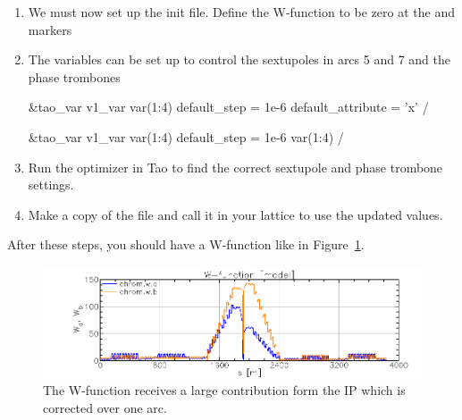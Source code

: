 \documentclass{hitec}     %
\begin{document}
{{{{\begin{enumerate}[leftmargin=*]
\begin{code}
    \end{code}
    \item We must now set up the init file. Define the W-function to be zero at the  and  markers
    \item The variables can be set up to control the sextupoles in arcs 5 and 7 and the phase trombones
    \begin{code}
 &tao_var
     v1_var%
     var(1:4)%
     default_step = 1e-6
     default_attribute = 'x'
/


&tao_var
    v1_var%
    var(1:4)%
    default_step = 1e-6
    var(1:4)%
/

    \end{code}  
    \item Run the optimizer in Tao to find the correct sextupole and phase trombone settings.
    \item Make a copy of the  file and call it in your lattice to use the updated values.
\end{enumerate}

After these steps, you should have a W-function like in Figure~\ref{f:W-function}.


\begin{figure}[tb]
  \centering
  \includegraphics[width=\textwidth]{figures/W_correction.png}
  \caption{The W-function receives a large contribution form the IP which is corrected over one arc.}
  \label{f:W-function}
\end{figure}


}}}}
\end{document}
